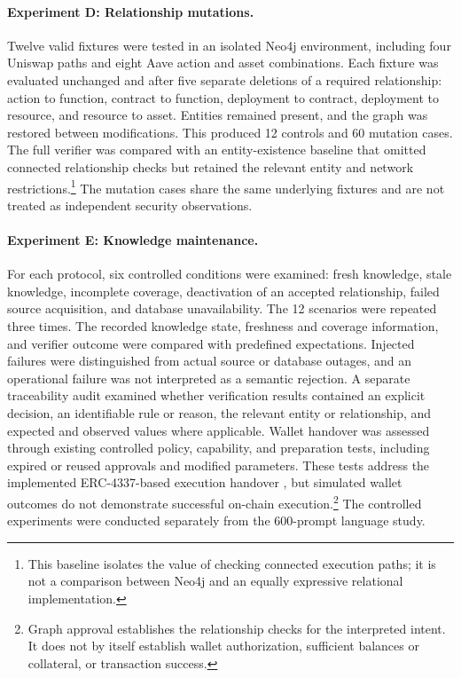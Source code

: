 \paragraph{Experiment D: Relationship mutations.}
Twelve valid fixtures were tested in an isolated Neo4j environment, including
four Uniswap paths and eight Aave action and asset combinations. Each fixture
was evaluated unchanged and after five separate deletions of a required
relationship: action to function, contract to function, deployment to
contract, deployment to resource, and resource to asset. Entities remained
present, and the graph was restored between modifications. This produced
12 controls and 60 mutation cases. The full verifier was compared with an
entity-existence baseline that omitted connected relationship checks but
retained the relevant entity and network restrictions.\footnote{This baseline
isolates the value of checking connected execution paths; it is not a
comparison between Neo4j and an equally expressive relational implementation.}
The mutation cases share the same underlying fixtures and are not treated as
independent security observations.

\paragraph{Experiment E: Knowledge maintenance.}
For each protocol, six controlled conditions were examined: fresh knowledge,
stale knowledge, incomplete coverage, deactivation of an accepted
relationship, failed source acquisition, and database unavailability. The
12 scenarios were repeated three times. The recorded knowledge state,
freshness and coverage information, and verifier outcome were compared with
predefined expectations. Injected failures were distinguished from actual
source or database outages, and an operational failure was not interpreted as
a semantic rejection. A separate traceability audit examined whether verification results contained
an explicit decision, an identifiable rule or reason, the relevant entity or
relationship, and expected and observed values where applicable. Wallet
handover was assessed through existing controlled policy, capability, and
preparation tests, including expired or reused approvals and modified
parameters. These tests address the implemented ERC-4337-based execution
handover \cite{implERC4337}, but simulated wallet outcomes do not demonstrate
successful on-chain execution.\footnote{Graph approval establishes the
relationship checks for the interpreted intent. It does not by itself
establish wallet authorization, sufficient balances or collateral, or
transaction success.} The controlled experiments were conducted separately
from the 600-prompt language study.

